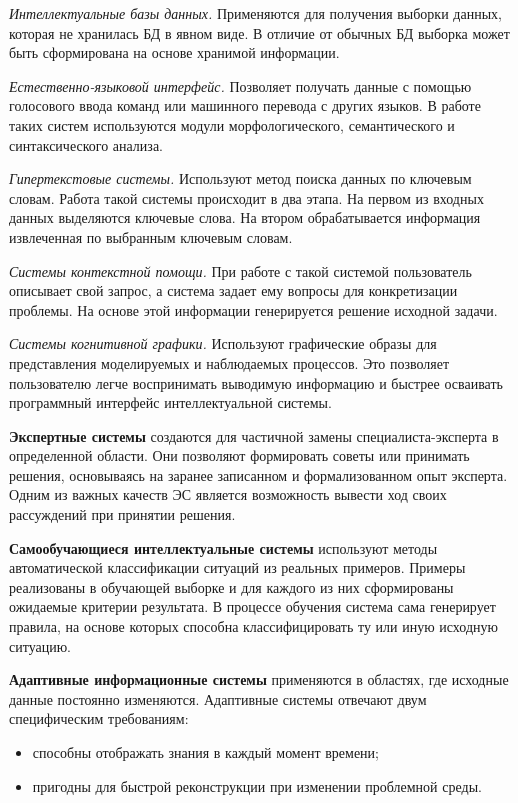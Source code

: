 \textit{Интеллектуальные базы данных.} Применяются для получения выборки данных, которая не хранилась БД в явном виде. В отличие от обычных БД выборка может быть сформирована на основе хранимой информации.

\textit{Естественно-языковой интерфейс.} Позволяет получать данные с помощью голосового ввода команд или машинного перевода с других языков. В работе таких систем используются модули морфологического, семантического и синтаксического анализа.

\textit{Гипертекстовые системы.} Используют метод поиска данных по ключевым словам. Работа такой системы происходит в два этапа. На первом из входных данных выделяются ключевые слова. На втором  обрабатывается информация извлеченная по выбранным ключевым словам.

\textit{Системы контекстной помощи.} При работе с такой системой пользователь описывает свой запрос, а система задает ему вопросы для конкретизации проблемы. На основе этой информации генерируется решение исходной задачи.

\textit{Системы когнитивной графики.} Используют графические образы для представления моделируемых и наблюдаемых процессов. Это позволяет пользователю легче воспринимать выводимую информацию и быстрее осваивать программный интерфейс интеллектуальной системы.

\textbf{Экспертные системы} создаются для частичной замены специалиста-эксперта в определенной области. Они позволяют формировать советы или принимать решения, основываясь на заранее записанном и формализованном опыт эксперта. Одним из важных качеств ЭС является возможность вывести ход своих рассуждений при принятии решения. 

\textbf{Самообучающиеся интеллектуальные системы} используют методы автоматической классификации ситуаций из реальных примеров. Примеры реализованы в обучающей выборке и для каждого из них сформированы ожидаемые критерии результата. В процессе обучения система сама генерирует правила, на основе которых способна классифицировать ту или иную исходную ситуацию. 

\textbf{Адаптивные информационные системы} применяются в областях, где исходные данные постоянно изменяются. Адаптивные системы отвечают двум специфическим требованиям:

\begin{itemize}
	\item способны отображать знания в каждый момент времени;
	\item пригодны для быстрой реконструкции при изменении проблемной среды.
\end{itemize}

